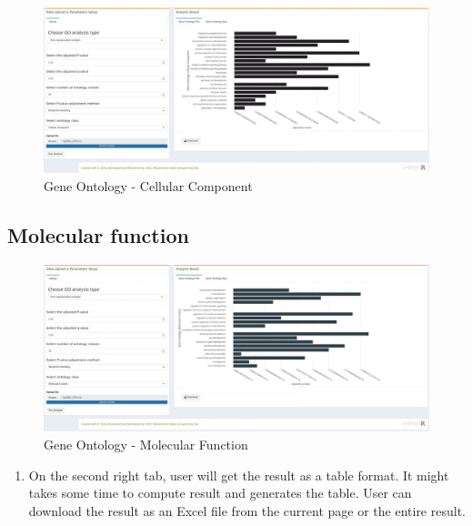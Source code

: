 \documentclass[
  a4paper,
  DIV=11,
  numbers=noendperiod,
  oneside,
  open=any]{scrreport}
\providecommand{\tightlist}{%
  \setlength{\itemsep}{0pt}\setlength{\parskip}{0pt}}\usepackage{longtable,booktabs,array}
\begin{document}
\begin{figure}[H]

{\centering \includegraphics{images/GO-CC.png}

}

\caption{Gene Ontology - Cellular Component}

\end{figure}%

\subsection{Molecular function}\label{molecular-function}

\begin{figure}[H]

{\centering \includegraphics{images/GO-MF.png}

}

\caption{Gene Ontology - Molecular Function}

\end{figure}%

\begin{enumerate}
\def\labelenumi{\arabic{enumi}.}
\setcounter{enumi}{1}
\tightlist
\item
  On the second right tab, user will get the result as a table format.
  It might takes some time to compute result and generates the table.
  User can download the result as an Excel file from the current page or
  the entire result.\\
\end{enumerate}
\end{document}
